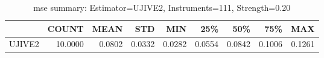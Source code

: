 \begin{table}[ht]
\centering
\caption{mse summary: Estimator=UJIVE2, Instruments=111, Strength=0.20}
\begin{tabular}{lrrrrrrrr}
\toprule
 & COUNT & MEAN & STD & MIN & 25\% & 50\% & 75\% & MAX \\
\midrule
UJIVE2 & 10.0000 & 0.0802 & 0.0332 & 0.0282 & 0.0554 & 0.0842 & 0.1006 & 0.1261 \\
\bottomrule
\end{tabular}
\end{table}

